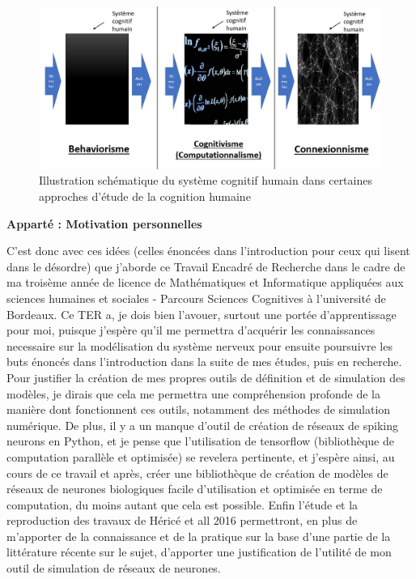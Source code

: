 \documentclass[12pt]{scrartcl}
\begin{document}
\begin{figure}[!h]
\centering
\includegraphics[scale=0.3]{imgs/1.JPG}
\caption{Illustration schématique du système cognitif humain dans certaines approches d'étude de la cognition humaine}
\end{figure}

\pagebreak

	\textbf{Apparté : Motivation personnelles}

	 C'est donc avec ces idées (celles énoncées dans l'introduction pour ceux qui lisent dans le désordre) que j'aborde ce Travail Encadré de Recherche dans le cadre de ma troisème année de licence de Mathématiques et Informatique appliquées aux sciences humaines et sociales - Parcours Sciences Cognitives à l'université de Bordeaux. Ce TER a, je dois bien l'avouer, surtout une portée d'apprentissage pour moi, puisque j'espère qu'il me permettra d'acquérir les connaissances necessaire sur la modélisation du système nerveux pour ensuite poursuivre les buts énoncés dans l'introduction dans la suite de mes études, puis en recherche. Pour justifier la création de mes propres outils de définition et de simulation des modèles, je dirais que cela me permettra une compréhension profonde de la manière dont fonctionnent ces outils, notamment des méthodes de simulation numérique. De plus, il y a un manque d'outil de création de réseaux de spiking neurons en Python, et je pense que l'utilisation de tensorflow (bibliothèque de computation parallèle et optimisée) se revelera pertinente, et j'espère ainsi, au cours de ce travail et après, créer une bibliothèque de création de modèles de réseaux de neurones biologiques facile d'utilisation et optimisée en terme de computation, du moins autant que cela est possible. Enfin l'étude et la reproduction des travaux de Héricé et all 2016 permettront, en plus de m'apporter de la connaissance et de la pratique sur la base d'une partie de la littérature récente sur le sujet, d'apporter une justification de l'utilité de mon outil de simulation de réseaux de neurones.
\end{document}
